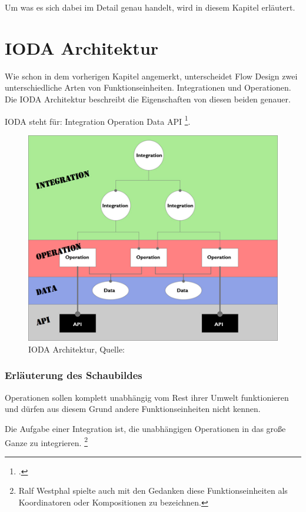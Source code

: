 Um was es sich dabei im Detail genau handelt, wird in diesem Kapitel erläutert.

\pagebreak
\section{IODA Architektur}


Wie schon in dem vorherigen Kapitel angemerkt, unterscheidet Flow Design zwei
unterschiedliche Arten von Funktionseinheiten. Integrationen und Operationen.
Die IODA Architektur beschreibt die Eigenschaften von diesen beiden genauer.

IODA steht für: Integration Operation Data API
\footcite{ioda}.


\begin{figure}[H]
	\centering
	\includegraphics[width=.9\linewidth]{./img/ioda.jpg}
	\caption{IODA Architektur, Quelle:\cite{ioda}}
\end{figure}


\subsubsection{Erläuterung des Schaubildes}

Operationen sollen komplett unabhängig vom Rest ihrer Umwelt funktionieren und
dürfen aus diesem Grund andere Funktionseinheiten nicht kennen.

Die Aufgabe einer Integration ist, die unabhängigen Operationen in das große Ganze zu
integrieren. 
\footnote{Ralf Westphal spielte auch mit den Gedanken diese Funktionseinheiten als Koordinatoren oder
Kompositionen zu bezeichnen.}

